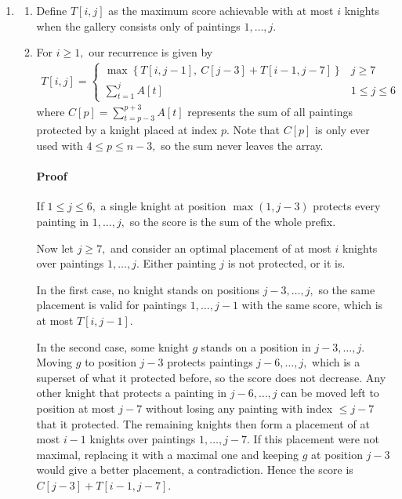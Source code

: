 \documentclass[12pt]{article}
\begin{document}
\begin{enumerate}
\begin{enumerate}
      \item
        \begin{enumerate}
          \item Define $T[i, j]$ as the maximum score achievable with
            at most $i$ knights when the gallery consists only of
            paintings $1, \ldots, j.$

          \item For $i \geq 1,$ our recurrence is given by
            \begin{align*}
              T[i, j] =
              \begin{cases}
                \max\left\{
                  T[i, j - 1], \
                  C[j - 3] + T[i - 1, j - 7]
                \right\} & j \geq 7 \\[2mm]
                \sum_{t = 1}^{j} A[t]  & 1 \leq j \leq 6
              \end{cases}
            \end{align*}
            where $C[p] = \sum_{t = p - 3}^{p + 3}A[t]$ represents
            the sum of all paintings protected by a knight placed at
            index $p.$ Note that $C[p]$ is only ever used with $4
            \leq p \leq n - 3,$ so the sum never leaves the array.

            \paragraph{Proof} If $1 \leq j \leq 6,$ a single knight
            at position $\max(1, j - 3)$ protects every painting in
            $1, \ldots, j,$ so the score is the sum of the whole prefix.

            Now let $j \geq 7,$ and consider an optimal placement of
            at most $i$ knights over paintings $1, \ldots, j.$ Either
            painting $j$ is not protected, or it is.

            In the first case, no knight stands on positions $j - 3,
            \ldots, j,$ so the same placement is valid for paintings
            $1, \ldots, j - 1$ with the same score, which is at most
            $T[i, j - 1].$

            In the second case, some knight $g$ stands on a position
            in $j - 3, \ldots, j.$ Moving $g$ to position $j - 3$
            protects paintings $j - 6, \ldots, j,$ which is a
            superset of what it protected before, so the score does
            not decrease. Any other knight that protects a painting
            in $j - 6, \ldots, j$ can be moved left to position at
            most $j - 7$ without losing any painting with index $\leq
            j - 7$ that it protected. The remaining knights then form
            a placement of at most $i - 1$ knights over paintings $1,
            \ldots, j - 7.$ If this placement were not maximal,
            replacing it with a maximal one and keeping $g$ at
            position $j - 3$ would give a better placement, a
            contradiction. Hence the score is $C[j - 3] + T[i - 1, j - 7].$


\end{enumerate}
\end{enumerate}
\end{enumerate}
\end{document}
